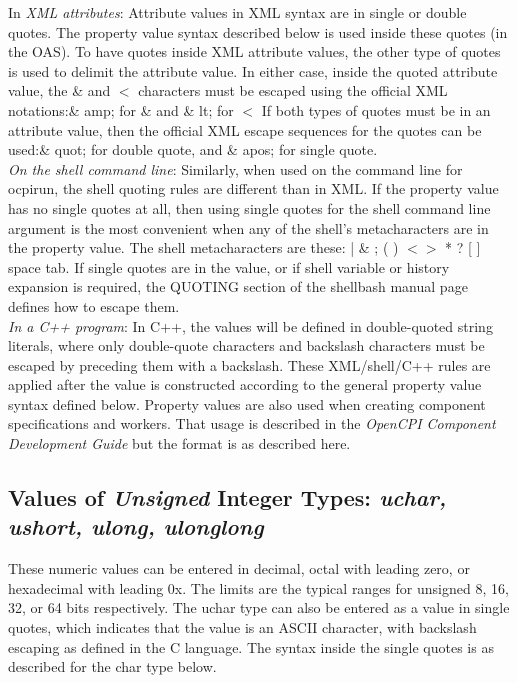 \documentclass[10pt, a4paper, oneside]{article}
\renewcommand\_{\textunderscore\allowbreak} %
\begin{document}
{In \emph{XML attributes}: Attribute values in XML syntax are in single or double quotes.  The property value syntax described below is used inside these quotes (in the OAS).  To have quotes inside XML attribute values, the other type of quotes is used to delimit the attribute value.  In either case, inside the quoted attribute value, the \& and $<$ characters must be escaped using the official XML notations:\& amp; for \& and \& lt; for $<$ If both types of quotes must be in an attribute value, then the official XML escape sequences for the quotes can be used:\& quot; for double quote, and \& apos; for single quote.\\

\emph{On the shell command line}: Similarly, when used on the command line for ocpirun, the shell quoting rules are different than in XML.  If the property value has no single quotes at all, then using single quotes for the shell command line argument is the most convenient when any of the shell's metacharacters are in the property value. The shell metacharacters are these: | \&  ;  (  )  $<$$>$ *  ?  [  ]  {  }  space  tab. If single quotes are in the value, or if shell variable or history expansion is required, the QUOTING section of the shell\/bash manual page defines how to escape them.\\

\emph{In a C++ program}:  In C++, the values will be defined in double-quoted string literals, where only double-quote characters and backslash characters must be escaped by preceding them with a backslash. These XML/shell/C++ rules are applied after the value is constructed according to the general property value syntax defined below. Property values are also used when creating component specifications and workers. That usage is described in the \emph{OpenCPI Component Development Guide} but the format is as described here.
\subsection {Values of \emph{Unsigned} Integer Types:  \emph{uchar, ushort, ulong, ulonglong}} These numeric values can be entered in decimal, octal with leading zero, or hexadecimal with leading 0x.  The limits are the typical ranges for unsigned 8, 16, 32, or 64 bits respectively. The uchar type can also be entered as a value in single quotes, which indicates that the value is an ASCII character, with backslash escaping as defined in the C language. The syntax inside the single quotes is as described for the char type below.
}
\end{document}
